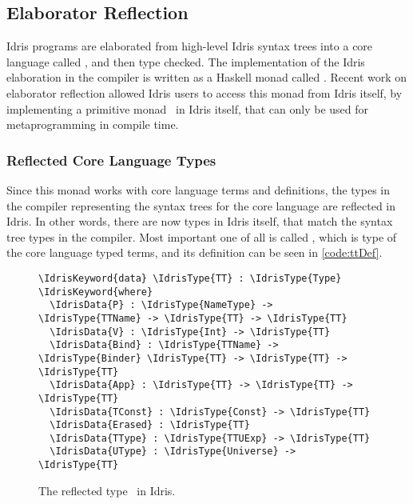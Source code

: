 \subsection{Elaborator Reflection}\label{ssec:elabref}

Idris programs are elaborated from high-level Idris syntax trees into a core
language called , and then type checked.\cite{idris}
The implementation of the Idris elaboration in the compiler is written as a
Haskell monad called .
Recent work on elaborator reflection\cite{elabref} allowed Idris users to
access this monad from Idris itself, by implementing a primitive monad \Elab\
in Idris itself, that can only be used for metaprogramming in compile time.

\subsubsection{Reflected Core Language Types}

Since this monad works with core language terms and definitions, the types in
the compiler representing the syntax trees for the core language are reflected
in Idris. In other words, there are now types in Idris itself, that match the
syntax tree types in the compiler. Most important one of all is called \TT,
which is type of the core language typed terms, and its definition can be seen
in \autoref{code:ttDef}.

\begin{figure}[ht]
\caption{The reflected type \protect\TT\ in Idris.}
\label{code:ttDef}
\begin{Verbatim}[framesep=2mm, label=\footnotesize{\normalfont{Idris}}, labelposition=topline]
\IdrisKeyword{data} \IdrisType{TT} : \IdrisType{Type} \IdrisKeyword{where}
  \IdrisData{P} : \IdrisType{NameType} -> \IdrisType{TTName} -> \IdrisType{TT} -> \IdrisType{TT}
  \IdrisData{V} : \IdrisType{Int} -> \IdrisType{TT}
  \IdrisData{Bind} : \IdrisType{TTName} -> \IdrisType{Binder} \IdrisType{TT} -> \IdrisType{TT} -> \IdrisType{TT}
  \IdrisData{App} : \IdrisType{TT} -> \IdrisType{TT} -> \IdrisType{TT}
  \IdrisData{TConst} : \IdrisType{Const} -> \IdrisType{TT}
  \IdrisData{Erased} : \IdrisType{TT}
  \IdrisData{TType} : \IdrisType{TTUExp} -> \IdrisType{TT}
  \IdrisData{UType} : \IdrisType{Universe} -> \IdrisType{TT}
\end{Verbatim}
\end{figure}

